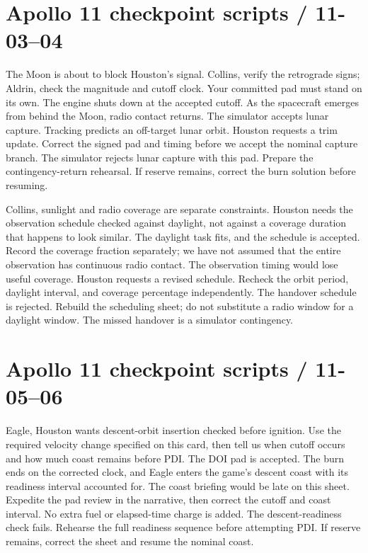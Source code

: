 \section*{Apollo 11 checkpoint scripts / 11-03--04}
{The Moon is about to block Houston's signal.
Collins, verify the retrograde signs; Aldrin, check the magnitude
and cutoff clock. Your committed pad must stand on its own.}
{The engine shuts down at the accepted cutoff.
As the spacecraft emerges from behind the Moon, radio contact
returns. The simulator accepts lunar capture.}
{Tracking predicts an off-target lunar orbit.
Houston requests a trim update. Correct the signed pad and timing
before we accept the nominal capture branch.}
{The simulator rejects lunar capture with this pad.
Prepare the contingency-return rehearsal.
If reserve remains, correct the burn solution before resuming.}

{Collins, sunlight and radio coverage are separate constraints.
Houston needs the observation schedule checked against daylight,
not against a coverage duration that happens to look similar.}
{The daylight task fits, and the schedule is accepted.
Record the coverage fraction separately; we have not assumed
that the entire observation has continuous radio contact.}
{The observation timing would lose useful coverage.
Houston requests a revised schedule. Recheck the orbit period,
daylight interval, and coverage percentage independently.}
{The handover schedule is rejected.
Rebuild the scheduling sheet; do not substitute a radio window
for a daylight window. The missed handover is a simulator contingency.}

\clearpage
\section*{Apollo 11 checkpoint scripts / 11-05--06}
{Eagle, Houston wants descent-orbit insertion checked before ignition.
Use the required velocity change specified on this card, then tell
us when cutoff occurs and how much coast remains before PDI.}
{The DOI pad is accepted.
The burn ends on the corrected clock, and Eagle enters the
game's descent coast with its readiness interval accounted for.}
{The coast briefing would be late on this sheet.
Expedite the pad review in the narrative, then correct the cutoff
and coast interval. No extra fuel or elapsed-time charge is added.}
{The descent-readiness check fails.
Rehearse the full readiness sequence before attempting PDI.
If reserve remains, correct the sheet and resume the nominal coast.}

